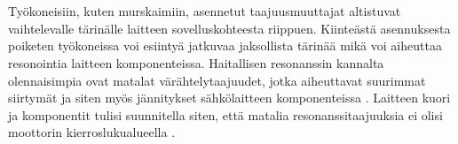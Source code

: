 \documentclass[finnish,12pt,a4paper,pdftex,elec,utf8]{aaltothesis}
\begin{document}
\\\\ 
Työkoneisiin, kuten murskaimiin, asennetut taajuusmuuttajat altistuvat vaihtelevalle tärinälle laitteen sovelluskohteesta riippuen. Kiinteästä asennuksesta poiketen työkoneissa voi esiintyä jatkuvaa jaksollista tärinää mikä voi aiheuttaa resonointia laitteen komponenteissa. Haitallisen resonanssin kannalta olennaisimpia ovat matalat värähtelytaajuudet, jotka aiheuttavat suurimmat siirtymät ja siten myös jännitykset sähkölaitteen komponenteissa \cite{Vibration}. Laitteen kuori ja komponentit tulisi suunnitella siten, että matalia resonanssitaajuuksia ei olisi moottorin kierroslukualueella \cite{Vibration}.
\end{document}
